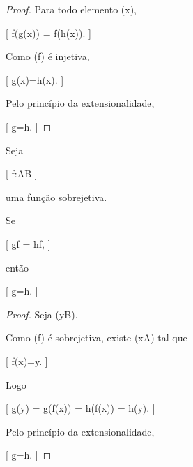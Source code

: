 \documentclass[../../main]{subfiles}
\begin{document}
\begin{proof}

	Para todo elemento (x),

	[
			f(g(x))
			=
			f(h(x)).
		]

	Como (f) é injetiva,

	[
			g(x)=h(x).
		]

	Pelo princípio da extensionalidade,

	[
			g=h.
		]

\end{proof}

\begin{prop}
	\label{prop:matematica:funcoes:composicao:cancelamento-direita}

	Seja

		[
			f:A\to B
		]

	uma função sobrejetiva.

	Se

		[
			g\circ f
			=
			h\circ f,
		]

	então

	[
	g=h.
	]

\end{prop}

\begin{proof}

	Seja (y\in B).

	Como (f) é sobrejetiva, existe
	(x\in A) tal que

		[
			f(x)=y.
		]

	Logo

		[
			g(y)
			=
			g(f(x))
			=
			h(f(x))
			=
			h(y).
		]

	Pelo princípio da extensionalidade,

	[
			g=h.
		]

\end{proof}
\end{document}
